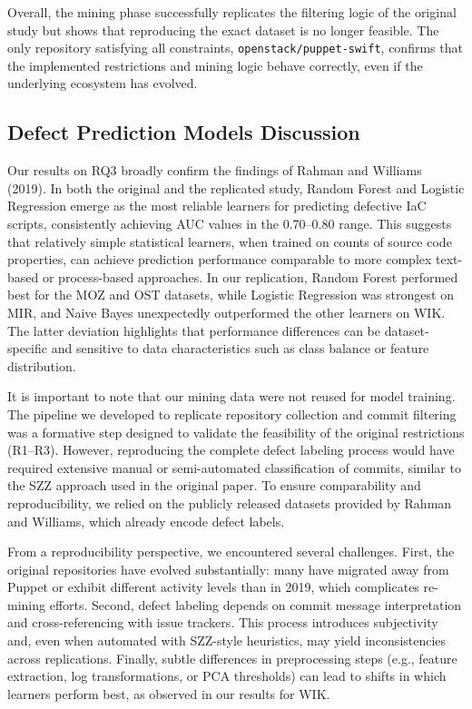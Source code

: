 \documentclass[conference]{IEEEtran}
\begin{document}
Overall, the mining phase successfully replicates the filtering logic of the original study but shows that reproducing the exact dataset is no longer feasible. The only repository satisfying all constraints, \texttt{openstack/puppet-swift}, confirms that the implemented restrictions and mining logic behave correctly, even if the underlying ecosystem has evolved.

\subsection{Defect Prediction Models Discussion}
Our results on RQ3 broadly confirm the findings of Rahman and Williams (2019). 
In both the original and the replicated study, Random Forest and Logistic Regression emerge as the most reliable learners for predicting defective IaC scripts, consistently achieving AUC values in the 0.70–0.80 range. 
This suggests that relatively simple statistical learners, when trained on counts of source code properties, can achieve prediction performance comparable to more complex text-based or process-based approaches. 
In our replication, Random Forest performed best for the MOZ and OST datasets, while Logistic Regression was strongest on MIR, and Naive Bayes unexpectedly outperformed the other learners on WIK. 
The latter deviation highlights that performance differences can be dataset-specific and sensitive to data characteristics such as class balance or feature distribution.

It is important to note that our mining data were not reused for model training. 
The pipeline we developed to replicate repository collection and commit filtering was a formative step designed to validate the feasibility of the original restrictions (R1–R3). 
However, reproducing the complete defect labeling process would have required extensive manual or semi-automated classification of commits, similar to the SZZ approach used in the original paper. 
To ensure comparability and reproducibility, we relied on the publicly released datasets provided by Rahman and Williams, which already encode defect labels.

From a reproducibility perspective, we encountered several challenges. 
First, the original repositories have evolved substantially: many have migrated away from Puppet or exhibit different activity levels than in 2019, which complicates re-mining efforts. 
Second, defect labeling depends on commit message interpretation and cross-referencing with issue trackers. 
This process introduces subjectivity and, even when automated with SZZ-style heuristics, may yield inconsistencies across replications. 
Finally, subtle differences in preprocessing steps (e.g., feature extraction, log transformations, or PCA thresholds) can lead to shifts in which learners perform best, as observed in our results for WIK.
\end{document}

